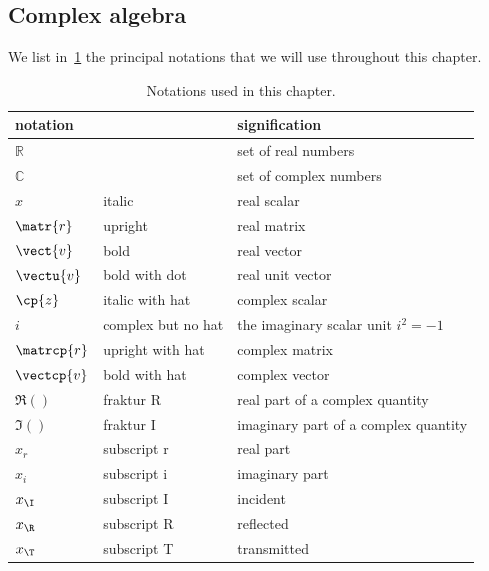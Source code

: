 \begin{refsection}
\FloatBarrier


\section{Complex algebra}
We list in~\cref{tab:notations} the principal notations that we will use throughout this chapter.

\begin{table}
    \centering
    \begin{tabular}{lll}
        \toprule
        notation     & & signification \\
        \midrule
        $\mathbb{R}$ &                    & set of real numbers\\
        $\mathbb{C}$ &                    & set of complex numbers\\        
        $x$          & italic             & real scalar\\
        $\matr{r}$   & upright            & real matrix\\
        $\vect{v}$   & bold               & real vector\\
        $\vectu{v}$  & bold with dot      & real unit vector\\
        $\cp{z}$     & italic with hat    & complex scalar\\
        $i$          & complex but no hat & the imaginary scalar unit $i^2=-1$\\
        $\matrcp{r}$ & upright with hat   & complex matrix \\
        $\vectcp{v}$ & bold with hat      & complex vector \\
        $\Re()$      & fraktur R          & real part of a complex quantity \\
        $\Im()$      & fraktur I          & imaginary part of a complex quantity \\
        $x_r$        & subscript r        & real part \\
        $x_i$        & subscript i        & imaginary part \\
        $x_\I$       & subscript I        & incident \\
        $x_\R$       & subscript R        & reflected \\
        $x_\T$       & subscript T        & transmitted \\
        \bottomrule        
    \end{tabular}
    \caption{Notations used in this chapter.}
    \label{tab:notations}
\end{table}


\end{refsection}
